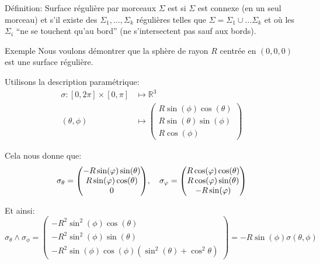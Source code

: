 \documentclass[a4paper]{article}
\begin{document}
\begin{parag}{Définition: Surface régulière par morceaux}
    $\Sigma$ est  si $\Sigma$ est connexe (en un seul morceau) et s'il existe des $\Sigma_1, \ldots, \Sigma_k$ régulières telles que $\Sigma = \Sigma_1 \cup \ldots \Sigma_k$ et où les $\Sigma_i$ ``ne se touchent qu'au bord'' (ne s'intersectent pas sauf aux bords).

\end{parag}

\begin{parag}{Exemple}
    Nous voulons démontrer que la sphère de rayon $R$ centrée en $\left(0, 0, 0\right)$ est une surface régulière. 

    Utilisons la description paramétrique:
    \[\begin{split}
    \sigma: \left[0, 2\pi\right]\times \left[0, \pi\right] &\longmapsto \mathbb{R}^3 \\
    \left(\theta, \phi\right) &\longmapsto \begin{pmatrix} R\sin\left(\phi\right)\cos\left(\theta\right) \\ R\sin\left(\theta\right)\sin\left(\phi\right) \\ R\cos\left(\phi\right) \end{pmatrix} 
    \end{split}\]
    
    Cela nous donne que:
    \[\sigma_{\theta} = \begin{pmatrix} -R\sin\left(\phi\right)\sin\left(\theta\right) \\ R\sin\left(\phi\right)\cos\left(\theta\right) \\ 0 \end{pmatrix}, \mathspace \sigma_{\phi} = \begin{pmatrix} R\cos\left(\phi\right)\cos\left(\theta\right) \\ R\cos\left(\phi\right)\sin\left(\theta\right) \\ -R\sin\left(\phi\right) \end{pmatrix} \]

    Et ainsi: 
    \[\sigma_{\theta} \wedge \sigma_{\phi} = \begin{pmatrix} -R^2 \sin^2\left(\phi\right) \cos\left(\theta\right) \\ -R^2\sin^2\left(\phi\right) \sin\left(\theta\right) \\ -R^2 \sin\left(\phi\right) \cos\left(\phi\right)\left(\sin^2\left(\theta\right) + \cos^2\theta\right) \end{pmatrix} = -R\sin\left(\phi\right) \sigma\left(\theta, \phi\right)\]
    

\end{parag}
\end{document}
